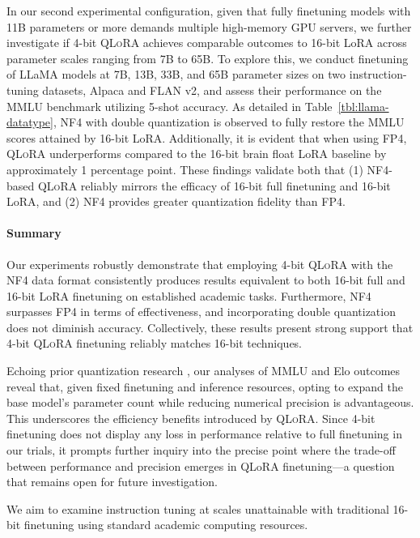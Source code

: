 In our second experimental configuration, given that fully finetuning models with 11B parameters or more demands multiple high-memory GPU servers, we further investigate if 4-bit \textsc{QLoRA} achieves comparable outcomes to 16-bit LoRA across parameter scales ranging from 7B to 65B. To explore this, we conduct finetuning of LLaMA models at 7B, 13B, 33B, and 65B parameter sizes on two instruction-tuning datasets, Alpaca and FLAN v2, and assess their performance on the MMLU benchmark utilizing 5-shot accuracy. As detailed in Table~\ref{tbl:llama-datatype}, NF4 with double quantization is observed to fully restore the MMLU scores attained by 16-bit LoRA. Additionally, it is evident that when using FP4, \textsc{QLoRA} underperforms compared to the 16-bit brain float LoRA baseline by approximately 1 percentage point. These findings validate both that (1) NF4-based \textsc{QLoRA} reliably mirrors the efficacy of 16-bit full finetuning and 16-bit LoRA, and (2) NF4 provides greater quantization fidelity than FP4.

\paragraph{Summary} Our experiments robustly demonstrate that employing 4-bit \textsc{QLoRA} with the NF4 data format consistently produces results equivalent to both 16-bit full and 16-bit LoRA finetuning on established academic tasks. Furthermore, NF4 surpasses FP4 in terms of effectiveness, and incorporating double quantization does not diminish accuracy. Collectively, these results present strong support that 4-bit \textsc{QLoRA} finetuning reliably matches 16-bit techniques.

Echoing prior quantization research \citep{dettmers2022case}, our analyses of MMLU and Elo outcomes reveal that, given fixed finetuning and inference resources, opting to expand the base model’s parameter count while reducing numerical precision is advantageous. This underscores the efficiency benefits introduced by \textsc{QLoRA}. Since 4-bit finetuning does not display any loss in performance relative to full finetuning in our trials, it prompts further inquiry into the precise point where the trade-off between performance and precision emerges in QLoRA finetuning—a question that remains open for future investigation.

We aim to examine instruction tuning at scales unattainable with traditional 16-bit finetuning using standard academic computing resources.

